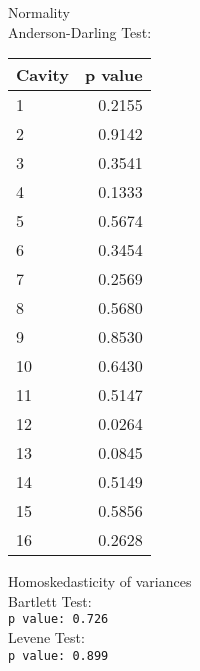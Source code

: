\begin{frame}
  \begin{minipage}[t]{0.48\textwidth}
    Normality\\

    \vspace*{0.25cm}
    Anderson-Darling Test:
    \begin{table}[ht]
      \begin{tiny}
        \begin{tabular}{lr}
          \hline
          Cavity & p value \\ 
          \hline
           1 & 0.2155 \\ 
           2 & 0.9142 \\ 
           3 & 0.3541 \\ 
           4 & 0.1333 \\ 
           5 & 0.5674 \\ 
           6 & 0.3454 \\ 
           7 & 0.2569 \\ 
           8 & 0.5680 \\ 
           9 & 0.8530 \\ 
          10 & 0.6430 \\ 
          11 & 0.5147 \\ 
          12 & 0.0264 \\ 
          13 & 0.0845 \\ 
          14 & 0.5149 \\ 
          15 & 0.5856 \\ 
          16 & 0.2628 \\ 
          \hline
        \end{tabular}
      \end{tiny}
    \end{table}
  \end{minipage}
  \hfill
  \begin{minipage}[t]{0.48\textwidth}
    Homoskedasticity of variances\\

    \vspace*{0.25cm}
    Bartlett Test:\\
    \texttt{p value: 0.726}\\

    \vspace*{0.75cm}
    Levene Test:\\
    \texttt{p value: 0.899}\\
  \end{minipage}
\end{frame}

